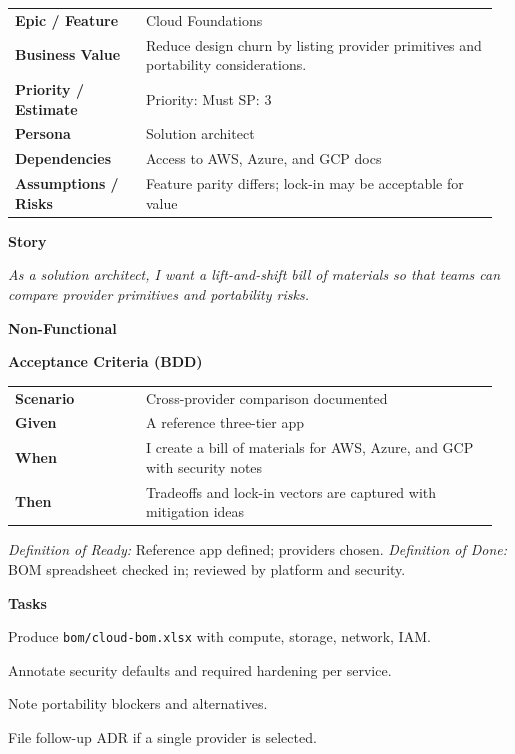 \documentclass[11pt,letterpaper]{article}
\makeatletter
\newenvironment{kvtable}{%
  \par\noindent\begin{tabular}{@{}>{\raggedright\bfseries\arraybackslash}p{0.26\linewidth} >{\raggedright\arraybackslash}p{0.70\linewidth}@{}}
}{\end{tabular}\par}
\newenvironment{bdd}{%
  \par\noindent\begin{tabular}{@{}>{\raggedright\bfseries\arraybackslash}p{0.26\linewidth} >{\raggedright\arraybackslash}p{0.70\linewidth}@{}}
}{\end{tabular}\par}
\newcommand{\DoRDoD}[2]{%
  \vspace{0.35em}
  {\footnotesize\color{Muted}%
    \textit{Definition of Ready:} #1 \; \textbullet\;
    \textit{Definition of Done:} #2%
  }%
}
\newenvironment{storycard}[2]{%
  \begin{tcolorbox}[cloudcard, title={#1 --- #2}]%
}{\end{tcolorbox}}
\newcommand{\sectionlabel}[1]{\par\vspace{0.35em}\textbf{#1}\par}
\makeatother
\begin{document}
\begin{storycard}{CCS-2}{Ch. 2 — Overview of Cloud Computing}
\begin{kvtable}
Epic / Feature & Cloud Foundations\\
Business Value & Reduce design churn by listing provider primitives and portability considerations.\\
Priority / Estimate & Priority: Must \quad SP: 3\\
Persona & Solution architect\\
Dependencies & Access to AWS, Azure, and GCP docs\\
Assumptions / Risks & Feature parity differs; lock-in may be acceptable for value\\
\end{kvtable}
\sectionlabel{Story}
\textit{As a solution architect, I want a lift-and-shift bill of materials so that teams can compare provider primitives and portability risks.}
\sectionlabel{Non-Functional}\;\;
\sectionlabel{Acceptance Criteria (BDD)}
\begin{bdd}
Scenario & Cross-provider comparison documented\\
Given & A reference three-tier app\\
When & I create a bill of materials for AWS, Azure, and GCP with security notes\\
Then & Tradeoffs and lock-in vectors are captured with mitigation ideas\\
\end{bdd}
\DoRDoD{Reference app defined; providers chosen.}{BOM spreadsheet checked in; reviewed by platform and security.}
\sectionlabel{Tasks}
\begin{checklist}
\item Produce \texttt{bom/cloud-bom.xlsx} with compute, storage, network, IAM.
\item Annotate security defaults and required hardening per service.
\item Note portability blockers and alternatives.
\item File follow-up ADR if a single provider is selected.
\end{checklist}
\end{storycard}
\end{document}
